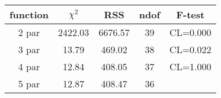\begin{tabular}{c|c|c|c|c}
function & $\chi^2$ & RSS & ndof & F-test \\
\hline
2 par & 2422.03 & 6676.57 & 39 & CL=0.000 \\
3 par & 13.79 & 469.02 & 38 & CL=0.022 \\
4 par & 12.84 & 408.05 & 37 & CL=1.000 \\
5 par & 12.87 & 408.47 & 36 & \\
\hline
\end{tabular}